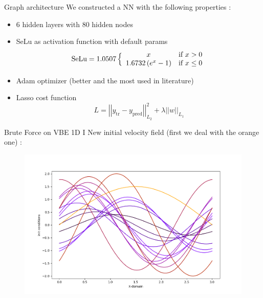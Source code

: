\documentclass[10pt,
			   xcolor=svgnames,
			   hyperref={linkcolor=red, citecolor = DarkGreen, colorlinks=true, urlcolor=Navy}]{beamer}
\newcommand{\bepar}[1]{
	\left( #1 \right)  
}
\newcommand{\norm}[1]{
	\left \vert \left \vert #1 \right \vert  \right \vert
}
\newcommand{\sarrow}{\item[\color{blue!50!black!70!orange!60} \tiny{\ding{55}}]}
\newcommand\bk{\color{black}}
\newcommand\navy{\color{navy}}
\newcommand\red{\color{red}}
\begin{document}
\begin{frame}{Graph architecture}
We constructed a NN with the following properties :
	\begin{itemize}
	\sarrow \red 6 \bk hidden layers with \red 80 \bk hidden nodes
	\sarrow \red SeLu \bk \citep{klambauer2017self} as activation function with default params\\
	\begin{equation*}
\text{SeLu} = 1. 0507 \,
\Big \{
		\begin{array}{c l}
		x & \text{if } x > 0 \\
		1 . 6732 \bepar{ e^x - 1} & \text{if } x \leq 0
		\end{array}						
\end{equation*}
	\sarrow \navy Adam \bk optimizer \citep{kingma2014adam} (better and the most used in literature)
	\sarrow \navy Lasso \bk cost function $$ L = \norm{ y_{\text{tr}} - y_{\text{pred}}}^2_{L_2} + \lambda \norm{w}_{L_1}$$	
	\end{itemize} 
	
%	
%	
%		

\end{frame}

\begin{frame}{Brute Force on VBE 1D I}
	New initial velocity field (first we deal with the \color{orange} orange \bk one) : 
	\begin{figure}[H]
	\centering
	\includegraphics[scale=0.4]{Initialisation_cases_Andu1.png}
	\end{figure}
\end{frame}
\end{document}

